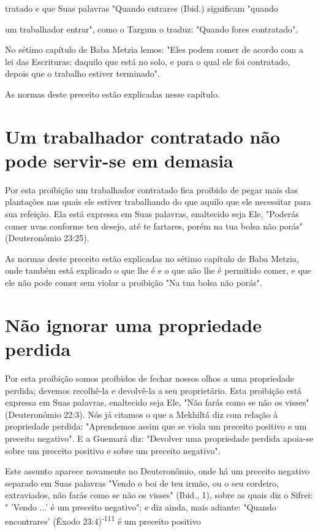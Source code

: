 tratado e que Suas palavras "Quando entrares (Ibid.) significam "quando

um trabalhador entrar", como o Targum o traduz: "Quando fores
contratado".

No sétimo capítulo de Baba Metzia lemos: "Eles podem comer de acordo com
a lei das Escrituras: daquilo que está no solo, e para o qual ele foi
contratado, depois que o trabalho estiver terminado".

As normas deste preceito estão explicadas nesse capítulo.

\section{Um trabalhador contratado não pode servir-se em demasia}

Por esta proibição um trabalhador contratado fica proibido de pe­gar
mais das plantações nas quais ele estiver trabalhando do que aquilo que
ele necessitar para sua refeição. Ela está expressa em Suas palavras,
enaltecido seja Ele, "Poderás comer uvas conforme teu desejo, até te
fartares, porém na tua bolsa não porás" (Deuteronômio 23:25).

As normas deste preceito estão explicadas no sétimo capítulo de Baba
Metzia, onde também está explicado o que lhe é e o que não lhe é
permitido comer, e que ele não pode comer sem violar a proibição "Na tua
bolsa não porás".

\section{Não ignorar uma propriedade perdida}

Por esta proibição somos proibidos de fechar nossos olhos a uma
propriedade perdida; devemos recolhê-la e devolvê-la a seu proprietário.
Esta proibição está expressa em Suas palavras, enaltecido seja Ele, "Não
farás co­mo se não os visses" (Deuteronômio 22:3). Nós já citamos o que
a Mekhiltá diz com relação à propriedade perdida: "Aprendemos assim que
se viola um preceito positivo e um preceito negativo". E a Guemará diz:
"Devolver uma propriedade perdida apoia-se sobre um preceito positivo e
sobre um preceito negativo".

Este assunto aparece novamente no Deuteronômio, onde há um pre­ceito
negativo separado em Suas palavras "Vendo o boi de teu irmão, ou o seu
cordeiro, extraviados, não farás como se não os visses" (Ibid., 1),
sobre as quais diz o Sifrei: " 'Vendo ...' é um preceito negativo"; e
diz ainda, mais adiante: "Quando encontrares' (Êxodo
23:4)\textsuperscript{-111} é um preceito positivo

